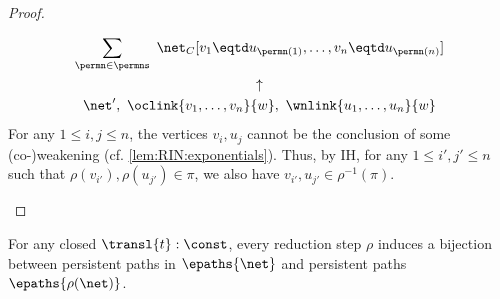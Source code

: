 \begin{proof}
\begin{itemize}
\begin{enumerate}
\begin{enumerate}
      \begin{gather*}
        \sum_{\permn \in \permns}\ \net_C
        [v_1 \eqtd u_{\permn(1)}, \ldots, v_n \eqtd u_{\permn(n)}]\\
        \uparrow\\
        \net',\ \oclink{v_1,\ldots,v_n}{w},\ \wnlink{u_1,\ldots, u_n}{w}
      \end{gather*}
      For any $1\leq i,j \leq n$,
      the vertices $v_i,u_j$ cannot be the conclusion 
      of some (co-)weakening (cf. \autoref{lem:RIN:exponentials}).
      Thus, by IH, for any $1\leq i',j' \leq n$ such that
      $\rho(v_{i'}), \rho(u_{j'}) \in \pi$, we also have
      $v_{i'},u_{j'} \in \rho^{-1}(\pi)$.
    \end{enumerate}
  \end{enumerate}
\end{itemize}
\vspace{-1.5em}
\end{proof}

\begin{theorem}
\label{thm:RIN:path-red:bij}
For any closed $\transl{t}:\const$, every reduction step $\rho$ induces a 
bijection between persistent paths in $\epaths{\net}$ and persistent paths 
$\epaths{\rho(\net)}$.
\end{theorem}


